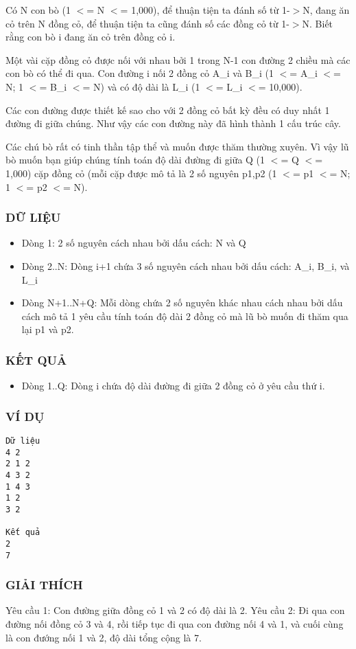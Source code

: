 



   Có N con bò (1 $<$= N $<$= 1,000), để thuận tiện ta đánh số từ 1-$>$N, đang ăn cỏ trên N đồng cỏ, để thuận tiện ta cũng đánh số các đồng cỏ từ 1-$>$N. Biết rằng con bò i đang ăn cỏ trên đồng cỏ i.  

   Một vài cặp đồng cỏ được nối với nhau bởi 1 trong N-1 con đường 2 chiều mà các con bò có thể đi qua. Con đường i nối 2 đồng cỏ A\_i và B\_i (1 $<$= A\_i $<$= N; 1 $<$= B\_i $<$= N) và có độ dài là L\_i (1 $<$= L\_i $<$= 10,000).  

   Các con đường được thiết kế sao cho với 2 đồng cỏ bất kỳ đều có duy nhất 1 đường đi giữa chúng. Như vậy các con đường này đã hình thành 1 cấu trúc cây.  

   Các chú bò rất có tinh thần tập thể và muốn được thăm thường xuyên. Vì vậy lũ bò muốn bạn giúp chúng tính toán độ dài đường đi giữa Q (1 $<$= Q $<$= 1,000) cặp đồng cỏ (mỗi cặp được mô tả là 2 số nguyên p1,p2 (1 $<$= p1 $<$= N; 1 $<$= p2 $<$= N).  

\subsubsection{   DỮ LIỆU  }
\begin{itemize}
	\item     Dòng 1: 2 số nguyên cách nhau bởi dấu cách: N và Q   
	\item     Dòng 2..N: Dòng i+1 chứa 3 số nguyên cách nhau bởi dấu cách: A\_i,         B\_i, và L\_i   
	\item     Dòng N+1..N+Q: Mỗi dòng chứa 2 số nguyên khác nhau cách nhau bởi dấu cách         mô tả 1 yêu cầu tính toán độ dài 2 đồng cỏ mà lũ bò muốn đi thăm qua lại p1 và p2.   
\end{itemize}

\subsubsection{   KẾT QUẢ  }
\begin{itemize}
	\item     Dòng 1..Q: Dòng i chứa độ dài đường đi giữa 2 đồng cỏ         ở yêu cầu thứ i.   
\end{itemize}

\subsubsection{   VÍ DỤ  }
\begin{verbatim}
Dữ liệu
4 2
2 1 2
4 3 2
1 4 3
1 2
3 2

Kết quả
2
7
\end{verbatim}

\subsubsection{   GIẢI THÍCH  }

   Yêu cầu 1: Con đường giữa đồng cỏ 1 và 2 có độ dài là 2. Yêu cầu 2: Đi qua con đường nối đồng cỏ 3 và 4, rồi tiếp tục đi qua con đường nối 4 và 1, và cuối cùng là con đướng nối 1 và 2, độ dài tổng cộng là 7.  